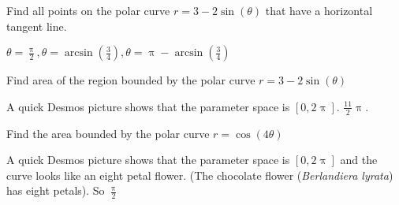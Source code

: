 \documentclass[12pt,fleqn,answers]{exam}
\begin{document}
\begin{questions}
\question Find all points on the polar curve $r = 3 - 2 \sin(\theta)$
that have a horizontal tangent line.

\begin{solution}[3.5in]
 $\theta= \frac{\uppi}{2},
  \theta = \operatorname{arcsin}\left( \frac{3}{4}\right) ,
  \theta = \uppi - \operatorname{arcsin}\left( \frac{3}{4}\right)$
\end{solution}

\question Find area of the region bounded by the  polar curve 
$r = 3 - 2 \sin(\theta)$

\begin{solution}[3.5in]
A quick Desmos picture shows that the parameter space is $[0,2\uppi]$.
 $\frac{11}{2} \uppi.$
\end{solution}

\question Find the area bounded by the polar curve $r = \cos(4 \theta)$
\begin{solution}[3.5in]
A quick Desmos picture shows that the parameter space is $[0,2\uppi]$ and the curve looks like an eight petal flower. (The chocolate flower (\emph{Berlandiera lyrata}) has eight petals). So 
  $\frac{\uppi}{2}$
\end{solution}




\end{questions}

    
\end{document}
